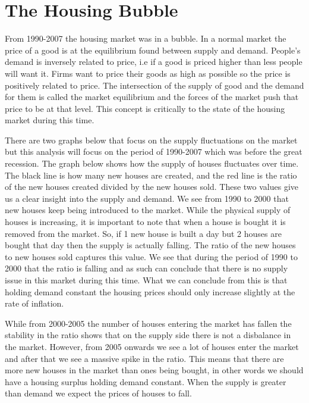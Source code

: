 \documentclass[
]{article}
\begin{document}
\section{The Housing Bubble}\label{the-housing-bubble}

From 1990-2007 the housing market was in a bubble. In a normal market
the price of a good is at the equilibrium found between supply and
demand. People's demand is inversely related to price, i.e if a good is
priced higher than less people will want it. Firms want to price their
goods as high as possible so the price is positively related to price.
The intersection of the supply of good and the demand for them is called
the market equilibrium and the forces of the market push that price to
be at that level. This concept is critically to the state of the housing
market during this time.

There are two graphs below that focus on the supply fluctuations on the
market but this analysis will focus on the period of 1990-2007 which was
before the great recession. The graph below shows how the supply of
houses fluctuates over time. The black line is how many new houses are
created, and the red line is the ratio of the new houses created divided
by the new houses sold. These two values give us a clear insight into
the supply and demand. We see from 1990 to 2000 that new houses keep
being introduced to the market. While the physical supply of houses is
increasing, it is important to note that when a house is bought it is
removed from the market. So, if 1 new house is built a day but 2 houses
are bought that day then the supply is actually falling. The ratio of
the new houses to new houses sold captures this value. We see that
during the period of 1990 to 2000 that the ratio is falling and as such
can conclude that there is no supply issue in this market during this
time. What we can conclude from this is that holding demand constant the
housing prices should only increase slightly at the rate of inflation.

While from 2000-2005 the number of houses entering the market has fallen
the stability in the ratio shows that on the supply side there is not a
disbalance in the market. However, from 2005 onwards we see a lot of
houses enter the market and after that we see a massive spike in the
ratio. This means that there are more new houses in the market than ones
being bought, in other words we should have a housing surplus holding
demand constant. When the supply is greater than demand we expect the
prices of houses to fall.
\end{document}

